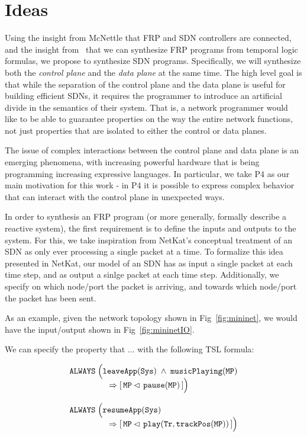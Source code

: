 \section{Ideas}

Using the insight from McNettle that FRP and SDN controllers are connected, and the insight from~\cite{FRPSynth} that we can synthesize FRP programs from temporal logic formulas, we propose to synthesize SDN programs.
Specifically, we will synthesize both the \textit{control plane} and the \textit{data plane} at the same time.
The high level goal is that while the separation of the control plane and the data plane is useful for building efficient SDNs, it requires the programmer to introduce an artificial divide in the semantics of their system.
That is, a network programmer would like to be able to guarantee properties on the way the entire network functions, not just properties that are isolated to either the control or data planes.

The issue of complex interactions between the control plane and data plane is an emerging phenomena, with increasing powerful hardware that is being programming increasing expressive languages.
In particular, we take P4 as our main motivation for this work - in P4 it is possible to express complex behavior that can interact with the control plane in unexpected ways.


In order to synthesis an FRP program (or more generally, formally describe a reactive system), the first requirement is to define the inputs and outputs to the system.
For this, we take inspiration from NetKat's conceptual treatment of an SDN as only ever processing a single packet at a time.
To formalize this idea presented in NetKat, our model of an SDN has as input a single packet at each time step, and as output a sinlge packet at each time step.
Additionally, we specify on which node/port the packet is arriving, and towards which node/port the packet has been sent.

As an example, given the network topology shown in Fig~\ref{fig:mininet}, we would have the input/output shown in Fig~\ref{fig:mininetIO}.

We can specify the property that ... with the following TSL formula:

\begin{align*}
& {\text{\texttt{ALWAYS}}} \; \Big({\text{\texttt{leaveApp}}}({\text{\texttt{Sys}}}) \; \wedge \; {\text{\texttt{musicPlaying}}}({\text{\texttt{MP}}}) \\[-0.5em]
& \quad \hspace{3.5em} \Rightarrow [\,{\text{\texttt{MP}}} \lhd \, {\text{\texttt{pause}}}({\text{\texttt{MP}}})\,] \Big) \\[0.8em]
& {\text{\texttt{ALWAYS}}} \; \Big({\text{\texttt{resumeApp}}}({\text{\texttt{Sys}}})  \\[-0.5em]
& \quad \hspace{3.5em} \Rightarrow  [\,{\text{\texttt{MP}}} \lhd \, {\text{\texttt{play}}}({\text{\texttt{Tr}}},{\text{\texttt{trackPos}}}({\text{\texttt{MP}}}))\,] \Big)
\end{align*}
